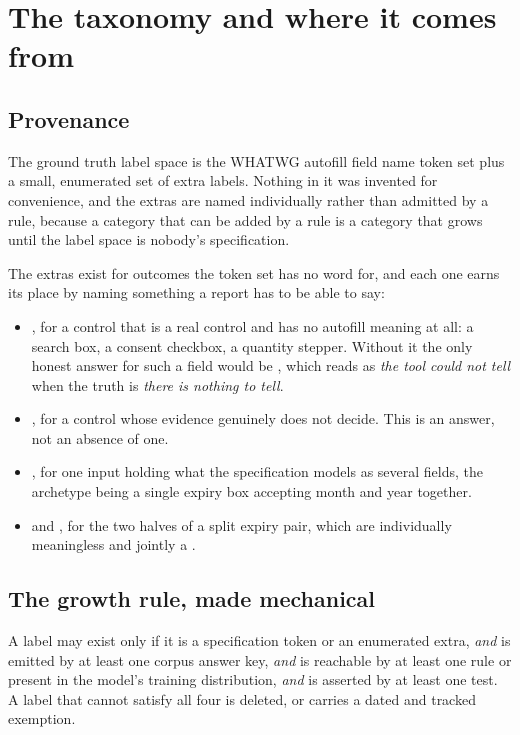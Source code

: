 \chapter{The taxonomy and where it comes from}
\label{ch:taxonomy}

\section{Provenance}

The ground truth label space is the WHATWG autofill field name token set
\cite{whatwg-autofill} plus a small, enumerated set of extra labels. Nothing in
it was invented for convenience, and the extras are named individually rather
than admitted by a rule, because a category that can be added by a rule is a
category that grows until the label space is nobody's specification.

The extras exist for outcomes the token set has no word for, and each one earns
its place by naming something a report has to be able to say:

\begin{itemize}
  \item {}, for a control that is a real control and has
    no autofill meaning at all: a search box, a consent checkbox, a quantity
    stepper. Without it the only honest answer for such a field would be
    , which reads as \emph{the tool could not tell} when the truth
    is \emph{there is nothing to tell}.
  \item {}, for a control whose evidence genuinely does not decide.
    This is an answer, not an absence of one.
  \item {}, for one input holding what the specification
    models as several fields, the archetype being a single expiry box
    accepting month and year together.
  \item {} and , for the
    two halves of a split expiry pair, which are individually meaningless and
    jointly a .
\end{itemize}

\section{The growth rule, made mechanical}

A label may exist only if it is a specification token or an enumerated extra,
\emph{and} is emitted by at least one corpus answer key, \emph{and} is reachable
by at least one rule or present in the model's training distribution, \emph{and}
is asserted by at least one test. A label that cannot satisfy all four is
deleted, or carries a dated and tracked exemption.

